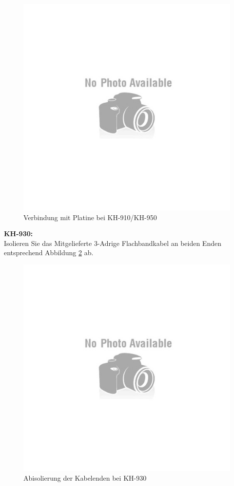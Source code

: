 \documentclass[fleqn,10pt]{SelfArx} %
\begin{document}
\begin{figure}[tbhp]\centering
\includegraphics[width=\linewidth]{no}
\caption{Verbindung mit Platine bei KH-910/KH-950}
\label{fig:abb7_4}
\end{figure}

\FloatBarrier

\textbf{KH-930:} \\

Isolieren Sie das Mitgelieferte 3-Adrige Flachbandkabel an beiden Enden entsprechend Abbildung \ref{fig:abb7_5} ab.

\begin{figure}[tbhp]\centering
\includegraphics[width=\linewidth]{no}
\caption{Abisolierung der Kabelenden bei KH-930}
\label{fig:abb7_5}
\end{figure}
\end{document}
